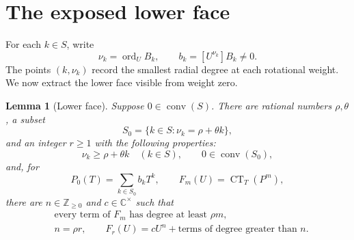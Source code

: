 \documentclass[11pt]{article}
\newtheorem{lemma}[theorem]{Lemma}
\newcommand{\C}{\mathbb C}
\newcommand{\Z}{\mathbb Z}
\newcommand{\CT}{\operatorname{CT}}
\newcommand{\ord}{\operatorname{ord}}
\newcommand{\conv}{\operatorname{conv}}
\begin{document}
\section{The exposed lower face}

For each \(k\in S\), write
\[
  \nu_k=\ord_U B_k,\qquad
  b_k=[U^{\nu_k}]B_k\neq0.
\]
The points \((k,\nu_k)\) record the smallest radial degree at each
rotational weight.  We now extract the lower face visible from weight zero.

\begin{lemma}[Lower face]\label{lem:face}
Suppose \(0\in\conv(S)\).  There are rational numbers \(\rho,\theta\), a
subset
\[
  S_0=\{k\in S:\nu_k=\rho+\theta k\},
\]
and an integer \(r\geq1\) with the following properties:
\[
  \nu_k\geq\rho+\theta k\quad(k\in S),\qquad
  0\in\conv(S_0),
\]
and, for
\[
  P_0(T)=\sum_{k\in S_0}b_kT^k,\qquad
  F_m(U)=\CT_T(P^m),
\]
there are \(n\in\Z_{\geq0}\) and \(c\in\C^\times\) such that
\begin{align}
  &\text{every term of }F_m\text{ has degree at least }\rho m,
       \label{eq:global-bound}\\
  &n=\rho r,\qquad F_r(U)=cU^n+\text{terms of degree greater than }n.
       \label{eq:leading}
\end{align}
\end{lemma}
\end{document}
